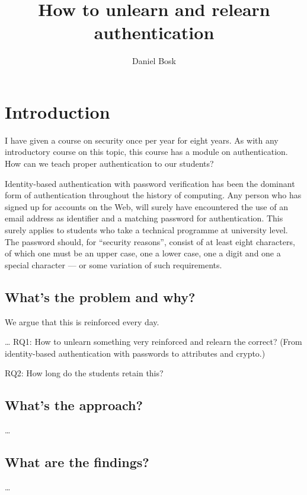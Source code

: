 \title{%
  How to unlearn and relearn authentication
}
\author{Daniel Bosk}


\begin{abstract}
  
\end{abstract}

\maketitle



\section{Introduction}

I have given a course on security once per year for eight years.
As with any introductory course on this topic, this course has a module on 
authentication.
How can we teach proper authentication to our students?

Identity-based authentication with password verification has been the dominant 
form of authentication throughout the history of computing.
Any person who has signed up for accounts on the Web, will surely have 
encountered the use of an email address as identifier and a matching password 
for authentication.
This surely applies to students who take a technical programme at university 
level.
The password should, for \enquote{security reasons}, consist of at least eight 
characters, of which one must be an upper case, one a lower case, one a digit 
and one a special character --- or some variation of such requirements.

\subsection{What's the problem and why?}

We argue that this is reinforced every day.

\dots
RQ1: How to unlearn something very reinforced and relearn the correct? (From 
identity-based authentication with passwords to attributes and crypto.)

RQ2: How long do the students retain this?


\subsection{What's the approach?}

\dots

\subsection{What are the findings?}

\dots



\printbibliography
